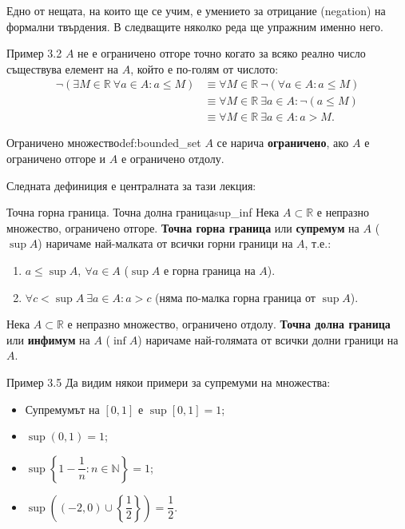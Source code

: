 Едно от нещата, на които ще се учим, е умението за отрицание (negation) на формални твърдения. В следващите няколко реда ще упражним именно него.

\begin{problembox}{Пример 3.2}
$A$ не е ограничено отгоре точно когато за всяко реално число съществува елемент на $A$, който е по-голям от числото:
\begin{align*}
\neg (\exists M \in \mathbb{R} \ \forall a \in A : a \le M) &\equiv \forall M \in \mathbb{R} \ \neg (\forall a \in A : a \le M) \\
&\equiv \forall M \in \mathbb{R} \ \exists a \in A : \neg (a \le M) \\
&\equiv \forall M \in \mathbb{R} \ \exists a \in A : a > M.
\end{align*}
\end{problembox}

\begin{definition}{Ограничено множество}{def:bounded_set}
$A$ се нарича \textbf{ограничено}, ако $A$ е ограничено отгоре и $A$ е ограничено отдолу.
\end{definition}

Следната дефиниция е централната за тази лекция:

\begin{definition}{Точна горна граница. Точна долна граница}{sup_inf}
Нека $A \subset \mathbb{R}$ е непразно множество, ограничено отгоре. \textbf{Точна горна граница} или \textbf{супремум} на $A$ ($\sup A$) наричаме най-малката от всички горни граници на $A$, т.е.:
\begin{enumerate}
    \item $a \le \sup A, \ \forall a \in A$ ($\sup A$ е горна граница на $A$).
    \item $\forall c < \sup A \ \exists a \in A : a > c$ (няма по-малка горна граница от $\sup A$).
\end{enumerate}

Нека $A \subset \mathbb{R}$ е непразно множество, ограничено отдолу. \textbf{Точна долна граница} или \textbf{инфимум} на $A$ ($\inf A$) наричаме най-голямата от всички долни граници на $A$.
\end{definition}

\begin{problembox}{Пример 3.5}
Да видим някои примери за супремуми на множества:
\begin{itemize}
    \item Супремумът на $[0, 1]$ е $\sup [0, 1] = 1$;
    \item $\sup (0, 1) = 1$;
    \item $\sup \left\{ 1 - \dfrac{1}{n} : n \in \mathbb{N} \right\} = 1$;
    \item $\sup \left( (-2, 0) \cup \left\{ \dfrac{1}{2} \right\} \right) = \dfrac{1}{2}$.
\end{itemize}
\end{problembox}

